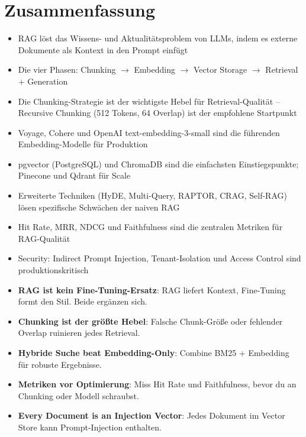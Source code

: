 \section{Zusammenfassung}

\begin{itemize}[leftmargin=*]
    \item RAG löst das Wissens- und Aktualitätsproblem von LLMs, indem es externe Dokumente als Kontext in den Prompt einfügt
    \item Die vier Phasen: Chunking $\rightarrow$ Embedding $\rightarrow$ Vector Storage $\rightarrow$ Retrieval + Generation
    \item Die Chunking-Strategie ist der wichtigste Hebel für Retrieval-Qualität -- Recursive Chunking (512 Tokens, 64 Overlap) ist der empfohlene Startpunkt
    \item Voyage, Cohere und OpenAI text-embedding-3-small sind die führenden Embedding-Modelle für Produktion
    \item pgvector (PostgreSQL) und ChromaDB sind die einfachsten Einstiegspunkte; Pinecone und Qdrant für Scale
    \item Erweiterte Techniken (HyDE, Multi-Query, RAPTOR, CRAG, Self-RAG) lösen spezifische Schwächen der naiven RAG
    \item Hit Rate, MRR, NDCG und Faithfulness sind die zentralen Metriken für RAG-Qualität
    \item Security: Indirect Prompt Injection, Tenant-Isolation und Access Control sind produktionskritisch
\end{itemize}

\begin{merke}
\begin{itemize}
    \item \textbf{RAG ist kein Fine-Tuning-Ersatz}: RAG liefert Kontext, Fine-Tuning formt den Stil. Beide ergänzen sich.
    \item \textbf{Chunking ist der größte Hebel}: Falsche Chunk-Größe oder fehlender Overlap ruinieren jedes Retrieval.
    \item \textbf{Hybride Suche beat Embedding-Only}: Combine BM25 + Embedding für robuste Ergebnisse.
    \item \textbf{Metriken vor Optimierung}: Miss Hit Rate und Faithfulness, bevor du an Chunking oder Modell schraubst.
    \item \textbf{Every Document is an Injection Vector}: Jedes Dokument im Vector Store kann Prompt-Injection enthalten.
\end{itemize}
\end{merke}

